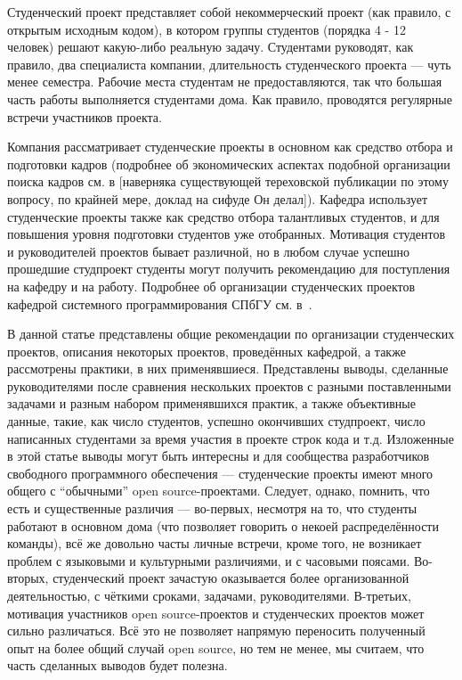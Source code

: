 \documentclass[a5paper]{article}
\begin{document}
Студенческий проект представляет собой некоммерческий проект (как правило, с открытым исходным кодом), в котором группы студентов (порядка 4 - 12 человек) решают какую-либо реальную задачу. Студентами руководят, как правило, два специалиста компании, длительность студенческого проекта --- чуть менее семестра. Рабочие места студентам не предоставляются, так что большая часть работы выполняется студентами дома. Как правило, проводятся регулярные встречи участников проекта.

Компания рассматривает студенческие проекты в основном как средство отбора и подготовки кадров (подробнее об экономических аспектах подобной организации поиска кадров см. в [наверняка существующей тереховской публикации по этому вопросу, по крайней мере, доклад на сифуде Он делал]). Кафедра использует студенческие проекты также как средство отбора талантливых студентов, и для повышения уровня подготовки студентов уже отобранных. Мотивация студентов и руководителей проектов бывает различной, но в любом случае успешно прошедшие студпроект студенты могут получить рекомендацию для поступления на кафедру и на работу. Подробнее об организации студенческих проектов кафедрой системного программирования СПбГУ см. в~\cite{gagarsky}.

В данной статье представлены общие рекомендации по организации студенческих проектов, описания некоторых проектов, проведённых кафедрой, а также рассмотрены практики, в них применявшиеся. Представлены выводы, сделанные руководителями после сравнения нескольких проектов с разными поставленными задачами и разным набором применявшихся практик, а также объективные данные, такие, как число студентов, успешно окончивших студпроект, число написанных студентами за время участия в проекте строк кода и т.д. Изложенные в этой статье выводы могут быть интересны и для сообщества разработчиков свободного программного обеспечения --- студенческие проекты имеют много общего с ``обычными'' open source-проектами. Следует, однако, помнить, что есть и существенные различия --- во-первых, несмотря на то, что студенты работают в основном дома (что позволяет говорить о некоей распределённости команды), всё же довольно часты личные встречи, кроме того, не возникает проблем с языковыми и культурными различиями, и с часовыми поясами. Во-вторых, студенческий проект зачастую оказывается более организованной деятельностью, с чёткими сроками, задачами, руководителями. В-третьих, мотивация участников open source-проектов и студенческих проектов может сильно различаться. Всё это не позволяет напрямую переносить полученный опыт на более общий случай open source, но тем не менее, мы считаем, что часть сделанных выводов будет полезна.
\end{document}
